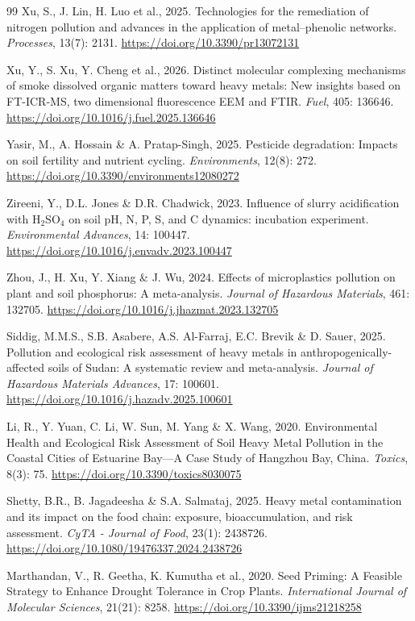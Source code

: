 \documentclass[sn-mathphys-num]{sn-jnl}
\begin{document}
\begin{thebibliography}{99}
Xu, S., J. Lin, H. Luo et al., 2025.
Technologies for the remediation of nitrogen pollution and advances in the
application of metal--phenolic networks.
\textit{Processes}, 13(7): 2131.
\url{https://doi.org/10.3390/pr13072131}

Xu, Y., S. Xu, Y. Cheng et al., 2026.
Distinct molecular complexing mechanisms of smoke dissolved organic matters
toward heavy metals: New insights based on FT-ICR-MS, two dimensional
fluorescence EEM and FTIR\@.
\textit{Fuel}, 405: 136646.
\url{https://doi.org/10.1016/j.fuel.2025.136646}

Yasir, M., A. Hossain \& A. Pratap-Singh, 2025.
Pesticide degradation: Impacts on soil fertility and nutrient cycling.
\textit{Environments}, 12(8): 272.
\url{https://doi.org/10.3390/environments12080272}

Zireeni, Y., D.L. Jones \& D.R. Chadwick, 2023.
Influence of slurry acidification with H$_2$SO$_4$ on soil pH, N, P, S, and
C dynamics: incubation experiment.
\textit{Environmental Advances}, 14: 100447.
\url{https://doi.org/10.1016/j.envadv.2023.100447}

Zhou, J., H. Xu, Y. Xiang \& J. Wu, 2024.
Effects of microplastics pollution on plant and soil phosphorus: A
meta-analysis.
\textit{Journal of Hazardous Materials}, 461: 132705.
\url{https://doi.org/10.1016/j.jhazmat.2023.132705}

Siddig, M.M.S., S.B. Asabere, A.S. Al-Farraj, E.C. Brevik \& D. Sauer, 2025.
Pollution and ecological risk assessment of heavy metals in
anthropogenically-affected soils of Sudan: A systematic review and
meta-analysis.
\textit{Journal of Hazardous Materials Advances}, 17: 100601.
\url{https://doi.org/10.1016/j.hazadv.2025.100601}

Li, R., Y. Yuan, C. Li, W. Sun, M. Yang \& X. Wang, 2020.
Environmental Health and Ecological Risk Assessment of Soil Heavy Metal
Pollution in the Coastal Cities of Estuarine Bay—A Case Study of Hangzhou
Bay, China.
\textit{Toxics}, 8(3): 75.
\url{https://doi.org/10.3390/toxics8030075}

Shetty, B.R., B. Jagadeesha \& S.A. Salmataj, 2025.
Heavy metal contamination and its impact on the food chain: exposure,
bioaccumulation, and risk assessment.
\textit{CyTA - Journal of Food}, 23(1): 2438726.
\url{https://doi.org/10.1080/19476337.2024.2438726}

Marthandan, V., R. Geetha, K. Kumutha et al., 2020.
Seed Priming: A Feasible Strategy to Enhance Drought Tolerance in Crop Plants.
\textit{International Journal of Molecular Sciences}, 21(21): 8258.
\url{https://doi.org/10.3390/ijms21218258}


\end{thebibliography}
\end{document}
